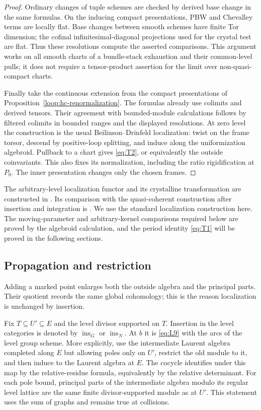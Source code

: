 \begin{proof}
Ordinary changes of tuple schemes are checked by derived base change
in the same formulas.  On the inducing compact presentations, PBW and
Chevalley terms are locally flat.  Base changes between smooth schemes
have finite Tor dimension; the cofinal infinitesimal-diagonal
projections used for the crystal test are flat.  Thus these resolutions
compute the asserted comparisons.  This argument works on all smooth
charts of a bundle-stack exhaustion and their common-level pulls; it
does not require a tensor-product assertion for the limit over
non-quasi-compact charts.

Finally take the continuous extension from the compact presentations
of Proposition~\ref{loop:hc-renormalization}.  The formulas already use colimits and derived
tensors.  Their agreement with bounded-module calculations follows by
filtered colimits in bounded ranges and the displayed resolutions.
At zero level the construction is the usual Beilinson--Drinfeld
localization: twist on the frame torsor, descend by positive-loop
splitting, and induce along the uniformization algebroid.  Pullback to
a chart gives \eqref{eq:T2}, or equivalently the outside coinvariants.
This also fixes its normalization, including the ratio rigidification
at $P_0$.  The inner presentation changes only the chosen frames.
\end{proof}

The arbitrary-level localization functor and its crystalline
transformation are constructed in \cite[Section~12.1, especially
Equation~(12.4)]{GLCII}.  Its comparison with the quasi-coherent
construction after insertion and integration is
\cite[Theorems~12.1.5 and~12.1.8]{GLCII}.  We use the standard
localization construction here.  The moving-parameter and
arbitrary-kernel comparisons required below are proved by the
algebroid calculation, and the period identity \eqref{eq:T1} will be
proved in the following sections.

\subsection{Propagation and restriction}

Adding a marked point enlarges both the outside algebra and the
principal parts.  Their quotient records the same global cohomology;
this is the reason localization is unchanged by insertion.

Fix $T\subseteq U'\subseteq E$ and the level divisor supported on $T$.
Insertion in the level categories is denoted by
$\operatorname{ins}_G$ or $\operatorname{ins}_N$.  At $b$ it is
\eqref{eq:L9} with the arcs of the level group scheme.  More explicitly,
use the intermediate Laurent algebra completed along $E$ but allowing
poles only on $U'$, restrict the old module to it, and then induce to
the Laurent algebra at $E$.  The cocycle identifies under this map by
the relative-residue formula, equivalently by the relative determinant.
For each pole bound, principal parts of the intermediate algebra
modulo its regular level lattice are the same finite
divisor-supported module as at $U'$.  This statement uses the sum of
graphs and remains true at collisions.

